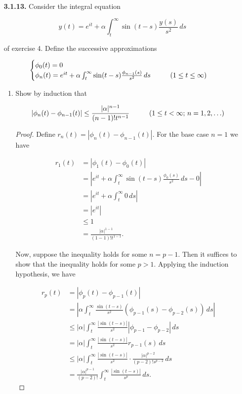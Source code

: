 \documentclass[11pt,oneside,english]{amsart}
\theoremstyle{definition}
\newcommand{\pspace}{\hspace{10mm}}
\begin{document}
\rightline{\today}



\vspace{1cm}
\begin{enumerate}





\item[\textbf{3.1.13.}] Consider the integral equation 

\[
y(t)=e^{it}+\alpha \int_t^\infty\sin (t-s)\frac{y(s)}{s^2}\,ds
\]

of exercise 4. Define the successive approximations


\[
\begin{cases}\phi_0(t)=0\\
\phi_n(t)=e^{it}+\alpha \int_t^\infty\sin(t-s)\frac{\phi_{n-1}(s)}{s^2}\,ds\pspace(1\leq t\leq \infty)\end{cases}
\]

\begin{enumerate}
\item Show by induction that

\[
\left|\phi_n(t)-\phi_{n-1}(t)\right|\leq\frac{|\alpha|^{n-1}}{(n-1)!t^{n-1}}\pspace(1\leq t<\infty;\,n=1,2,\ldots)
\]


\begin{proof}
Define $r_n(t)=|\phi_n(t)-\phi_{n-1}(t)|$. For the base case $n=1$ we have

\begin{align*}
r_1(t)&=|\phi_1(t)-\phi_0(t)|\\[2mm]
&=\left|e^{it}+\alpha \int_t^\infty\sin(t-s)\frac{\phi_0(s)}{s^2}\,ds-0\right|\\[2mm]
&=\left|e^{it}+\alpha \int_t^\infty0\,ds\right|\\[2mm]
&=\left|e^{it}\right|\\[2mm]
&\leq 1\\[2mm]
&=\frac{|\alpha|^{1-1}}{(1-1)!t^{1-1}}.
\end{align*}

Now, suppose the inequality holds for some $n=p-1$. Then it suffices to show that the inequality holds for some $p>1$. Applying the induction hypothesis, we have

\begin{align*}
r_p(t)&=|\phi_p(t)-\phi_{p-1}(t)|\\[2mm]
&=\left|\alpha\int_t^\infty\frac{\sin(t-s)}{s^2}(\phi_{p-1}(s)-\phi_{p-2}(s))\,ds\right|\\[2mm]
&\leq|\alpha|\int_t^\infty\frac{|\sin(t-s)|}{s^2}|\phi_{p-1}-\phi_{p-2}|\,ds\\[2mm]
&=|\alpha|\int_t^\infty\frac{|\sin(t-s)|}{s^2}r_{p-1}(s)\,ds\\[2mm]
&\leq|\alpha|\int_t^\infty\frac{|\sin(t-s)|}{s^2}\cdot\frac{|\alpha|^{p-2}}{(p-2)!s^{p-2}}\,ds\\[2mm]
&=\frac{|\alpha|^{p-1}}{(p-2)!}\int_t^\infty\frac{|\sin(t-s)|}{s^p}\,ds.
\end{align*}


\end{proof}
\end{enumerate}
\end{enumerate}
\end{document}
